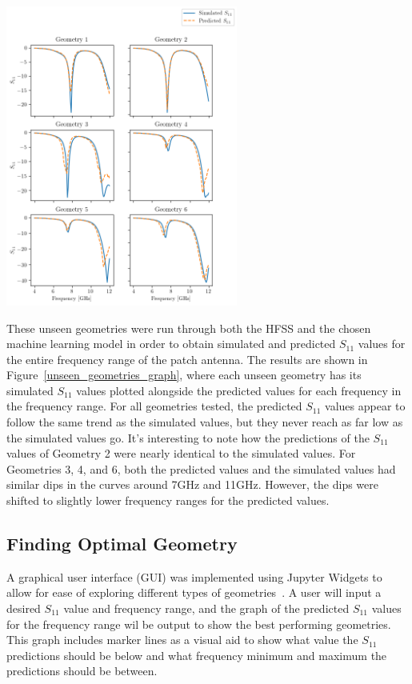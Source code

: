 \documentclass[conference]{IEEEtran}
\newenvironment{Figure}
    {\par\medskip\noindent\minipage{\linewidth}}
    {\endminipage\par\medskip}
\begin{document}
\begin{Figure}
    \centering
    \includegraphics[width=3in]{unseen_geometries_freq_vs_seq}
    \label{unseen_geometries_graph}
\end{Figure}

These unseen geometries were run through both the HFSS and the chosen machine learning model in order to obtain simulated and predicted $S_{11}$ values for the entire frequency range of the patch antenna. The results are shown in Figure~\ref{unseen_geometries_graph}, where each unseen geometry has its simulated $S_{11}$ values plotted alongside the predicted values for each frequency in the frequency range. For all geometries tested, the predicted $S_{11}$ values appear to follow the same trend as the simulated values, but they never reach as far low as the simulated values go. It's interesting to note how the predictions of the $S_{11}$ values of Geometry 2 were nearly identical to the simulated values. For Geometries 3, 4, and 6, both the predicted values and the simulated values had similar dips in the curves around 7GHz and 11GHz. However, the dips were shifted to slightly lower frequency ranges for the predicted values.

\subsection{Finding Optimal Geometry}
A graphical user interface (GUI) was implemented using Jupyter Widgets to allow for ease of exploring different types of geometries~\cite{interactive_Jupyter_widgets}. A user will input a desired $S_{11}$ value and frequency range, and the graph of the predicted $S_{11}$ values for the frequency range wil be output to show the best performing geometries. This graph includes marker lines as a visual aid to show what value the $S_{11}$ predictions should be below and what frequency minimum and maximum the predictions should be between.
\end{document}
